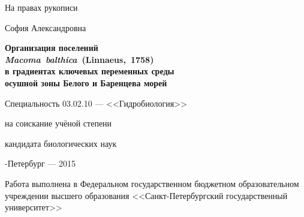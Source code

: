 \newcommand{\sfs}{\fontsize{14pt}{15pt}\selectfont}
\sfs %
\thispagestyle{empty}

\vspace{10mm}
\begin{flushright}
	\Large На правах рукописи 
\end{flushright}

\vspace{30mm}
\begin{center}
{\Large{} София Александровна}
\end{center}

\vspace{30mm}
\begin{center}
{\bf \LARGE Организация поселений \\ \textit{ Macoma~balthica}~(Linnaeus,~1758) \\ в градиентах ключевых переменных среды \\ осушной зоны Белого и Баренцева морей
\par}

\vspace{30mm}
{\Large
Специальность 03.02.10 --- <<Гидробиология>>
}

\vspace{15mm}
\par
{} на соискание учёной степени\par
кандидата биологических наук
\end{center}

\vspace{40mm}
\begin{center}
{-Петербург --- 2015}
\end{center}

\newpage
\thispagestyle{empty}
\noindent Работа выполнена в Федеральном государственном бюджетном образовательном учреждении высшего образования <<Санкт-Петербургский  государственный  университет>>

